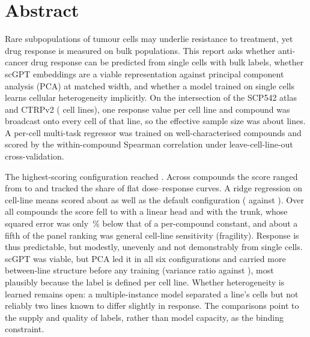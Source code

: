 \chapter*{Abstract}
\thispagestyle{empty}

Rare subpopulations of tumour cells may underlie resistance to treatment, yet drug response is
measured on bulk populations. This report asks whether anti-cancer drug response can be predicted from
single cells with bulk labels, whether scGPT embeddings are a viable representation against principal
component analysis (PCA) at matched width, and whether a model trained on single cells learns cellular
heterogeneity implicitly. On the intersection of the SCP542 atlas and CTRPv2 (\NLines{} cell lines), one
response value per cell line and compound was broadcast onto every cell of that line, so the effective
sample size was about \NLinesCV{} lines. A per-cell multi-task regressor was trained on \NPanel{}
well-characterised compounds and scored by the within-compound Spearman correlation under
leave-cell-line-out cross-validation.

The highest-scoring configuration reached \SpBest{}. Across compounds the score ranged from \SpDrugLo{} to
\SpDrugHi{} and tracked the share of flat dose--response curves. A ridge regression on cell-line means scored about
as well as the default configuration (\RidgePca{} against \SwPcaMaeZero{}). Over all \NDrugsModelled{}
compounds the score fell to \SpAllDrugs{} with a linear head and \HdAllTrunkPca{} with the trunk, whose
squared error was only \HdGainTrunkPca\,\% below that of a per-compound constant, and about a fifth of the
panel ranking was general cell-line sensitivity (fragility). Response is thus predictable, but modestly, unevenly and
not demonstrably from single cells. scGPT was viable, but PCA led it in all six configurations and
carried more between-line structure before any training (variance ratio \BtwRatioPca{} against
\BtwRatioScgpt{}), most plausibly because the label is defined per cell line. Whether heterogeneity is
learned remains open: a multiple-instance model separated a line's cells but not reliably two lines known
to differ slightly in response. The comparisons point to the supply and quality of labels, rather than model
capacity, as the binding constraint.

\clearpage

